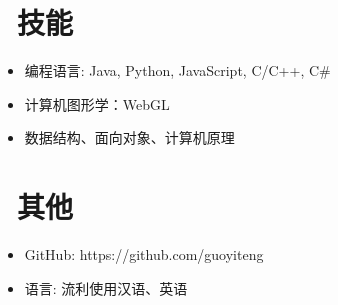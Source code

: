\documentclass{resume}
\begin{document}

\section{\faCogs\ 技能}
\begin{itemize}[parsep=0.5ex]
  \item 编程语言: Java, Python, JavaScript, C/C++, C\#
  \item 计算机图形学：WebGL
  \item 数据结构、面向对象、计算机原理
\end{itemize}


\section{\faInfo\ 其他}
\begin{itemize}[parsep=0.5ex]
  \item GitHub: https://github.com/guoyiteng
  \item 语言: 流利使用汉语、英语
\end{itemize}

%
%
\end{document}
